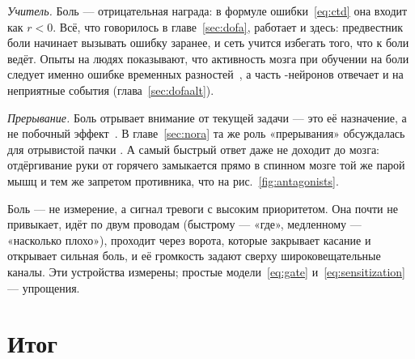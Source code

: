 \emph{Учитель.} Боль --- отрицательная награда: в формуле ошибки~\eqref{eq:ctd} она входит как $r<0$. Всё, что говорилось в главе~\ref{sec:dofa}, работает и здесь: предвестник боли начинает вызывать ошибку заранее, и сеть учится избегать того, что к боли ведёт. Опыты на людях показывают, что активность мозга при обучении на боли следует именно ошибке временных разностей~\cite{Seymour2004}, а часть -нейронов отвечает и на неприятные события (глава~\ref{sec:dofaalt}).

\emph{Прерывание.} Боль отрывает внимание от текущей задачи --- это её назначение, а не побочный эффект~\cite{EcclestonCrombez1999}. В главе~\ref{sec:nora} та же роль «прерывания» обсуждалась для отрывистой пачки . А самый быстрый ответ даже не доходит до мозга: отдёргивание руки от горячего замыкается прямо в спинном мозге той же парой мышц и тем же запретом противника, что на рис.~\ref{fig:antagonists}.

\begin{keyblock}
\begin{proposition}
\label{prop:pain}
Боль --- не измерение, а сигнал тревоги с высоким приоритетом. Она почти не привыкает, идёт по двум проводам (быстрому --- «где», медленному --- «насколько плохо»), проходит через ворота, которые закрывает касание и открывает сильная боль, и её громкость задают сверху широковещательные каналы. Эти устройства измерены; простые модели~\eqref{eq:gate} и~\eqref{eq:sensitization} --- упрощения.
\end{proposition}
\end{keyblock}

\section{Итог}

